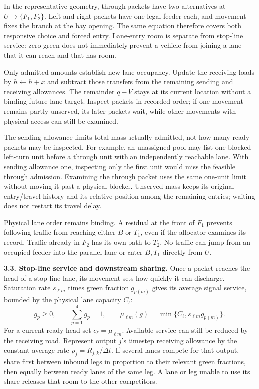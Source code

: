 \documentclass[10pt,a4paper]{article}
\begin{document}
In the representative geometry, through packets have two alternatives
at $U\to\{F_1,F_2\}$. Left and right packets have one legal feeder each,
and movement fixes the branch at the bay opening. The same equation
therefore covers both responsive choice and forced entry. Lane-entry
room is separate from stop-line service: zero green does not immediately
prevent a vehicle from joining a lane that it can reach and that has room.

Only admitted amounts establish new lane occupancy. Update the receiving
loads by $h\leftarrow h+x$ and subtract those transfers from the remaining
sending and receiving allowances. The remainder $q-V$ stays at its current
location without a binding future-lane target. Inspect packets in recorded
order; if one movement remains partly unserved, its later packets wait,
while other movements with physical access can still be examined.

\begin{samepage}
The sending allowance limits total mass actually admitted, not how many
ready packets may be inspected. For example, an unassigned pool may list
one blocked left-turn unit before a through unit with an independently
reachable lane. With sending allowance one, inspecting only the first
unit would miss the feasible through admission. Examining the through
packet uses the same one-unit limit without moving it past a physical
blocker. Unserved mass keeps its original entry/travel history and its
relative position among the remaining entries; waiting does not restart
its travel delay.
\par\end{samepage}

Physical lane order remains binding. A residual at the front of $F_1$
prevents following traffic from reaching either $B$ or $T_1$, even if
the allocator examines its record. Traffic already in $F_2$ has its own
path to $T_2$. No traffic can jump from an occupied feeder into the
parallel lane or enter $B,T_1$ directly from $U$.

\textbf{3.3. Stop-line service and downstream sharing.}
Once a packet reaches the head of a stop-line lane, its movement sets
how quickly it can discharge. Saturation rate $s_{\ell m}$ times green
fraction $g_{p(m)}$ gives its average signal service, bounded by the
physical lane capacity $C_\ell$:
\begin{equation}
 g_p\geq0,\qquad \sum_{p=1}^4g_p=1,\qquad
 \mu_{\ell m}(g)=\min\{C_\ell,s_{\ell m}g_{p(m)}\}.
 \label{eq:compact-action}
\end{equation}
For a current ready head set $c_\ell=\mu_{\ell m}$.
Available service can still be reduced by the receiving road. Represent
output $j$'s timestep receiving allowance by the constant average rate
$\rho_j=R_{j,k}/\Delta t$. If several lanes compete for that output,
share first between inbound legs in proportion to their relevant green
fractions, then equally between ready lanes of the same leg. A lane or
leg unable to use its share releases that room to the other competitors.
\end{document}
